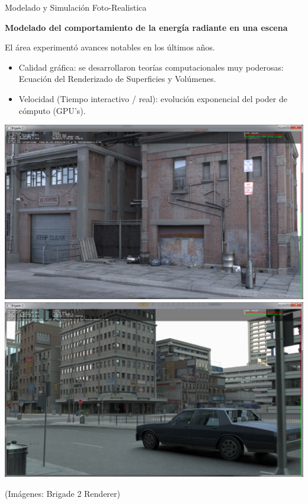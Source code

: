 \documentclass[spanish]{beamer}
\begin{document}
\begin{frame}{Modelado y Simulación Foto-Realistica}

\textbf{Modelado del comportamiento de la energía radiante en una escena}

El área experimentó avances notables en los últimos años.
\begin{block}{}
\begin{itemize}
\item Calidad gráfica: se desarrollaron teorías computacionales muy poderosas: Ecuación del Renderizado de Superficies y Volúmenes.
\item Velocidad (Tiempo interactivo / real): evolución exponencial del poder de cómputo (GPU's).
\end{itemize}
\end{block}

\includegraphics[scale = 0.15]{../figures/hd1.png}
\includegraphics[scale = 0.15]{../figures/blinn5ed.png}

(Imágenes: Brigade 2 Renderer)


\end{frame}
\end{document}
